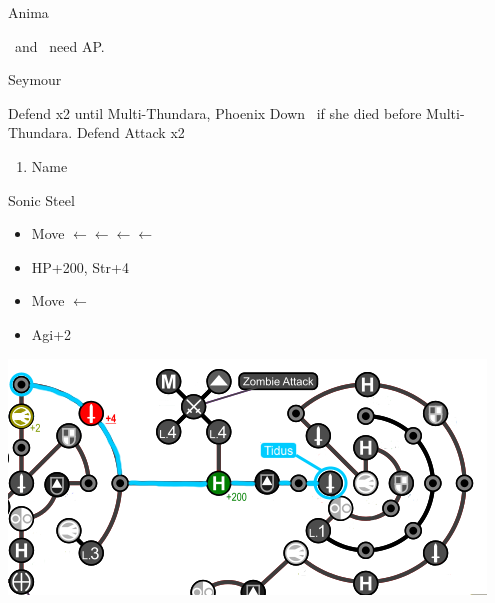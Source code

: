 \begin{battle}[18000]{Anima}
	\begin{itemize}
		      \tidus\ and \yuna\ need AP.
	\end{itemize}
\end{battle}
\begin{battle}[6000]{Seymour}
	\begin{itemize}
		\tidusf Defend x2 until Multi-Thundara, Phoenix Down \rikku\ if she died before Multi-Thundara.
	      \rikkuf Defend
	      \tidusf Attack x2
	\end{itemize}
\end{battle}
\begin{enumerate}[resume]
	\item Name \shiva
\end{enumerate}
\begin{equip}
	\begin{itemize}
		\tidusf Sonic Steel
	\end{itemize}
\end{equip}
\winvfill
\begin{spheregrid}
	\begin{itemize}
		\tidusf
		\begin{itemize}
			\item Move $\leftarrow\leftarrow\leftarrow\leftarrow$
			\item HP+200, Str+4
			\item Move $\leftarrow$
			\item Agi+2
		\end{itemize}
		\includegraphics[width=.8\columnwidth]{graphics/Tidus_Post_Seymour}
	\end{itemize}
\end{spheregrid}
